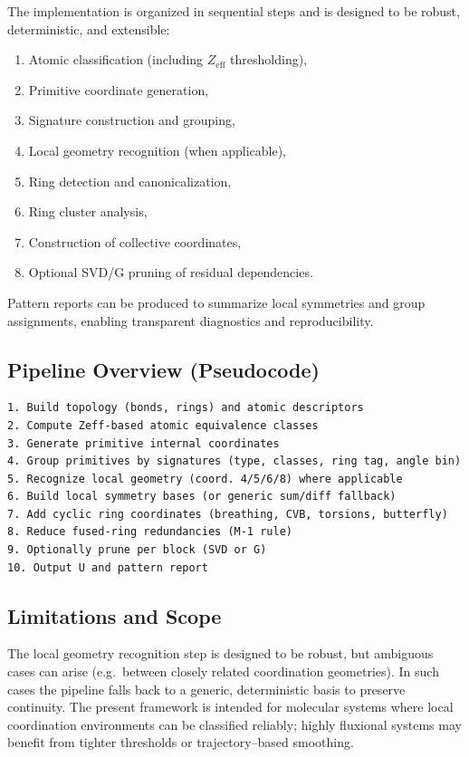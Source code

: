 \documentclass[11pt,a4paper]{article}
\begin{document}
The implementation is organized in sequential steps and is designed to be
robust, deterministic, and extensible:
\begin{enumerate}
  \item Atomic classification (including $Z_{\mathrm{eff}}$ thresholding),
  \item Primitive coordinate generation,
  \item Signature construction and grouping,
  \item Local geometry recognition (when applicable),
  \item Ring detection and canonicalization,
  \item Ring cluster analysis,
  \item Construction of collective coordinates,
  \item Optional SVD/G pruning of residual dependencies.
\end{enumerate}

Pattern reports can be produced to summarize local symmetries and
group assignments, enabling transparent diagnostics and reproducibility.

\subsection{Pipeline Overview (Pseudocode)}

\begin{verbatim}
1. Build topology (bonds, rings) and atomic descriptors
2. Compute Zeff-based atomic equivalence classes
3. Generate primitive internal coordinates
4. Group primitives by signatures (type, classes, ring tag, angle bin)
5. Recognize local geometry (coord. 4/5/6/8) where applicable
6. Build local symmetry bases (or generic sum/diff fallback)
7. Add cyclic ring coordinates (breathing, CVB, torsions, butterfly)
8. Reduce fused-ring redundancies (M-1 rule)
9. Optionally prune per block (SVD or G)
10. Output U and pattern report
\end{verbatim}

\subsection{Limitations and Scope}

The local geometry recognition step is designed to be robust, but ambiguous
cases can arise (e.g.\ between closely related coordination geometries). In such
cases the pipeline falls back to a generic, deterministic basis to preserve
continuity. The present framework is intended for molecular systems where local
coordination environments can be classified reliably; highly fluxional systems
may benefit from tighter thresholds or trajectory--based smoothing.
\end{document}
